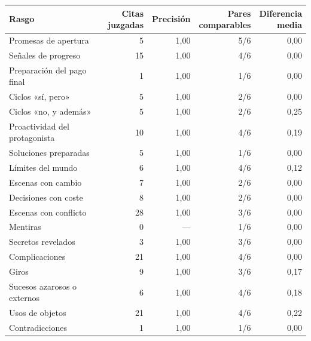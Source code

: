\begin{tabular}{@{}>{\raggedright\arraybackslash}p{5.1cm}rrrr@{}}
\toprule
Rasgo & \shortstack{Citas\\juzgadas} & Precisión & \shortstack{Pares\\comparables} & \shortstack{Diferencia\\media} \\
\midrule
Promesas de apertura & 5 & 1,00 & 5/6 & 0,00 \\
Señales de progreso & 15 & 1,00 & 4/6 & 0,00 \\
Preparación del pago final & 1 & 1,00 & 1/6 & 0,00 \\
Ciclos «sí, pero» & 5 & 1,00 & 2/6 & 0,00 \\
Ciclos «no, y además» & 5 & 1,00 & 2/6 & 0,25 \\
Proactividad del protagonista & 10 & 1,00 & 4/6 & 0,19 \\
Soluciones preparadas & 5 & 1,00 & 1/6 & 0,00 \\
Límites del mundo & 6 & 1,00 & 4/6 & 0,12 \\
Escenas con cambio & 7 & 1,00 & 2/6 & 0,00 \\
Decisiones con coste & 8 & 1,00 & 2/6 & 0,00 \\
Escenas con conflicto & 28 & 1,00 & 3/6 & 0,00 \\
Mentiras & 0 & --- & 1/6 & 0,00 \\
Secretos revelados & 3 & 1,00 & 3/6 & 0,00 \\
Complicaciones & 21 & 1,00 & 4/6 & 0,00 \\
Giros & 9 & 1,00 & 3/6 & 0,17 \\
Sucesos azarosos o externos & 6 & 1,00 & 4/6 & 0,18 \\
Usos de objetos & 21 & 1,00 & 4/6 & 0,22 \\
Contradicciones & 1 & 1,00 & 1/6 & 0,00 \\
\bottomrule
\end{tabular}
